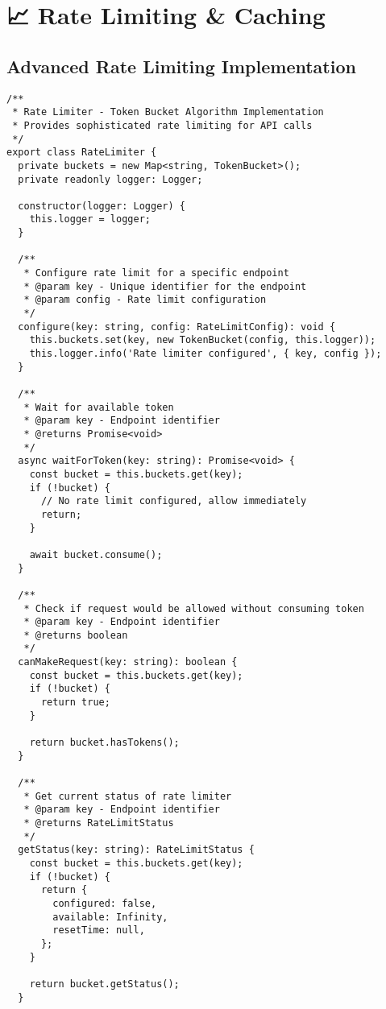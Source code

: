 \documentclass[11pt,a4paper]{article}
\begin{document}
\section{📈 Rate Limiting & Caching}

\subsection{Advanced Rate Limiting Implementation}

\begin{lstlisting}[style=typescript, caption=Sophisticated Rate Limiting System]
/**
 * Rate Limiter - Token Bucket Algorithm Implementation
 * Provides sophisticated rate limiting for API calls
 */
export class RateLimiter {
  private buckets = new Map<string, TokenBucket>();
  private readonly logger: Logger;

  constructor(logger: Logger) {
    this.logger = logger;
  }

  /**
   * Configure rate limit for a specific endpoint
   * @param key - Unique identifier for the endpoint
   * @param config - Rate limit configuration
   */
  configure(key: string, config: RateLimitConfig): void {
    this.buckets.set(key, new TokenBucket(config, this.logger));
    this.logger.info('Rate limiter configured', { key, config });
  }

  /**
   * Wait for available token
   * @param key - Endpoint identifier
   * @returns Promise<void>
   */
  async waitForToken(key: string): Promise<void> {
    const bucket = this.buckets.get(key);
    if (!bucket) {
      // No rate limit configured, allow immediately
      return;
    }

    await bucket.consume();
  }

  /**
   * Check if request would be allowed without consuming token
   * @param key - Endpoint identifier
   * @returns boolean
   */
  canMakeRequest(key: string): boolean {
    const bucket = this.buckets.get(key);
    if (!bucket) {
      return true;
    }

    return bucket.hasTokens();
  }

  /**
   * Get current status of rate limiter
   * @param key - Endpoint identifier
   * @returns RateLimitStatus
   */
  getStatus(key: string): RateLimitStatus {
    const bucket = this.buckets.get(key);
    if (!bucket) {
      return {
        configured: false,
        available: Infinity,
        resetTime: null,
      };
    }

    return bucket.getStatus();
  }


\end{lstlisting}
\end{document}

